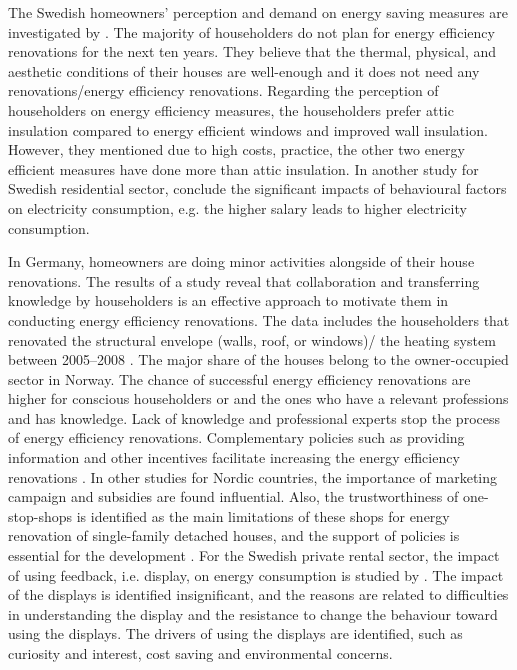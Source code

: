 \documentclass[preprint,12pt,3p]{elsarticle}
\begin{document}
The Swedish homeowners' perception and demand on energy saving measures are investigated by \citep{nair2010}. The majority of householders do not plan for energy efficiency renovations for the next ten years. They believe that the thermal, physical, and aesthetic conditions of their houses are well-enough and it does not need any renovations/energy efficiency renovations. Regarding the perception of householders on energy efficiency measures, the householders prefer attic insulation compared to energy efficient windows and improved wall insulation. However, they mentioned due to high costs, practice, the other two energy efficient measures have done more than attic insulation.  In another study for Swedish residential sector, \citeauthor{vassileva2012} \citeyearpar{vassileva2012} conclude the significant impacts of behavioural factors on electricity consumption, e.g. the higher salary leads to higher electricity consumption.

In Germany, homeowners are doing minor activities alongside of their house renovations. The results of a study reveal that collaboration and transferring knowledge by householders is an effective approach to motivate them in conducting energy efficiency renovations. The data includes the householders that renovated the structural envelope (walls, roof, or windows)/ the heating system between 2005–2008 \citep{stieb2013}. The major share of the houses belong to the owner-occupied sector in Norway. The chance of successful energy efficiency renovations are higher for conscious  householders or and the ones who have a relevant professions and has knowledge. Lack of knowledge and professional experts stop the process of energy efficiency renovations. Complementary policies such as providing information and other incentives facilitate increasing the energy efficiency renovations \citep{risholt2013}. In other studies for Nordic countries, the importance of marketing campaign and subsidies are found influential. Also, the trustworthiness of one-stop-shops is identified as the main limitations of these shops for energy renovation of single-family detached houses, and the support of policies is essential for the development \citep{mahapatra2009, mahapatra2013}. For the Swedish private rental sector, the impact of using feedback, i.e. display, on energy consumption is studied by \citep{nilsson2014}. The impact of the displays is identified insignificant, and the reasons are related to difficulties in understanding the display and the resistance to change the behaviour toward using the displays. The drivers of using the displays are identified, such as curiosity and interest, cost saving and environmental concerns.
\end{document}
